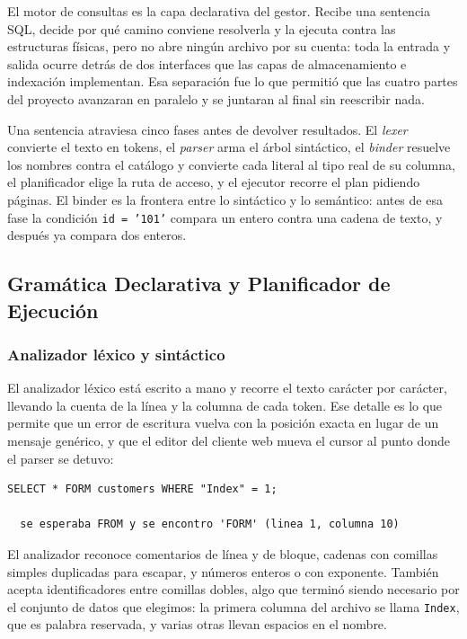 \documentclass[a4paper,12pt]{article}
\begin{document}
El motor de consultas es la capa declarativa del gestor. Recibe una sentencia
SQL, decide por qué camino conviene resolverla y la ejecuta contra las
estructuras físicas, pero no abre ningún archivo por su cuenta: toda la entrada
y salida ocurre detrás de dos interfaces que las capas de almacenamiento e
indexación implementan. Esa separación fue lo que permitió que las cuatro
partes del proyecto avanzaran en paralelo y se juntaran al final sin reescribir
nada.

Una sentencia atraviesa cinco fases antes de devolver resultados. El
\textit{lexer} convierte el texto en tokens, el \textit{parser} arma el árbol
sintáctico, el \textit{binder} resuelve los nombres contra el catálogo y
convierte cada literal al tipo real de su columna, el planificador elige la
ruta de acceso, y el ejecutor recorre el plan pidiendo páginas. El binder es la
frontera entre lo sintáctico y lo semántico: antes de esa fase la condición
\texttt{id = '101'} compara un entero contra una cadena de texto, y después ya
compara dos enteros.

\subsection{Gramática Declarativa y Planificador de Ejecución}

\subsubsection{Analizador léxico y sintáctico}

El analizador léxico está escrito a mano y recorre el texto carácter por
carácter, llevando la cuenta de la línea y la columna de cada token. Ese detalle
es lo que permite que un error de escritura vuelva con la posición exacta en
lugar de un mensaje genérico, y que el editor del cliente web mueva el cursor
al punto donde el parser se detuvo:

\begin{lstlisting}[caption={Error de sintaxis con posición}]
SELECT * FORM customers WHERE "Index" = 1;

  se esperaba FROM y se encontro 'FORM' (linea 1, columna 10)
\end{lstlisting}

El analizador reconoce comentarios de línea y de bloque, cadenas con comillas
simples duplicadas para escapar, y números enteros o con exponente. También
acepta identificadores entre comillas dobles, algo que terminó siendo necesario
por el conjunto de datos que elegimos: la primera columna del archivo se llama
\texttt{Index}, que es palabra reservada, y varias otras llevan espacios en el
nombre.
\end{document}
